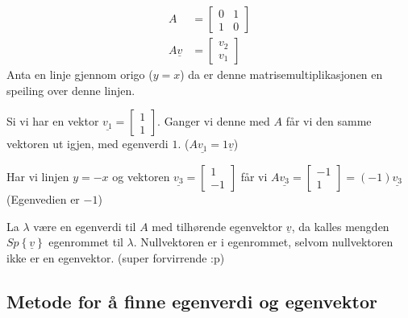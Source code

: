 \documentclass[11pt, a4paper, norsk]{article}
\begin{document}
        \begin{Example}{}{}
            \begin{align*}
                A &= \begin{bmatrix}
                    0 & 1 \\
                    1 & 0
                \end{bmatrix}
                \\
                A\underline{v} &= \begin{bmatrix}
                    v_2 \\
                    v_1
                \end{bmatrix}
            \end{align*}
            Anta en linje gjennom origo ($y = x$) da er denne matrisemultiplikasjonen en speiling over denne linjen. 

            Si vi har en vektor $\underline{v_1} = \begin{bmatrix}
                1 \\
                1
            \end{bmatrix}$. Ganger vi denne med $A$ får vi den samme vektoren ut igjen, med egenverdi $1$. ($A\underline{v_1} = 1\underline{v}$)

            Har vi linjen $y = -x$ og vektoren $\underline{v_3} = \begin{bmatrix}
                1 \\
                -1
            \end{bmatrix}$ får vi $A\underline{v_3} = \begin{bmatrix}
                -1 \\
                1
            \end{bmatrix} = (-1)\underline{v_3}$ (Egenvedien er $-1$)
        \end{Example}
    
        \begin{Definition}{}{}
            La $\lambda$ være en egenverdi til $A$ med tilhørende egenvektor $\underline{v}$, da kalles mengden $Sp\left\{\underline{v}\right\}$ egenrommet til $\lambda$. Nullvektoren er i egenrommet, selvom nullvektoren ikke er en egenvektor. (super forvirrende :p)
        \end{Definition}

        \subsection{Metode for å finne egenverdi og egenvektor}%
        \label{sub:metode_for_a_finne_egenverider_og_egenvektorer}
        
\end{document}
